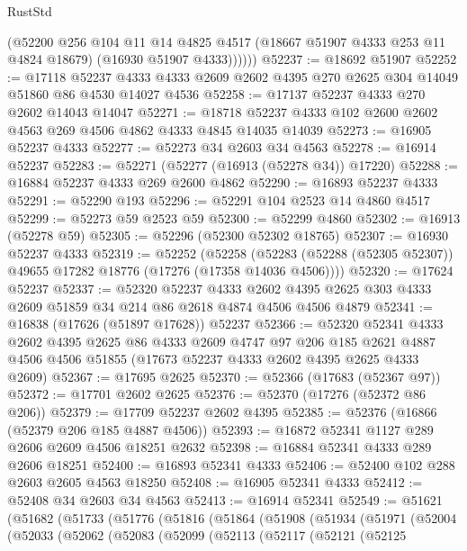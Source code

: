 \begin{lexlean}{RustStd}
\begin{coremodule}
            (@52200
              @256
              @104
              @11
              @14
              @4825
              @4517
              (@18667 @51907 @4333 @253 @11 @4824 @18679)
              (@16930 @51907 @4333))))))
@52237 := @18692 @51907
@52252 := @17118
    @52237
    @4333
    @4333
    @2609
    @2602
    @4395
    @270
    @2625
    @304
    @14049
    @51860
    @86
    @4530
    @14027
    @4536
@52258 := @17137 @52237 @4333 @270 @2602 @14043 @14047
@52271 := @18718 @52237 @4333 @102 @2600 @2602 @4563 @269 @4506 @4862 @4333 @4845 @14035 @14039
@52273 := @16905 @52237 @4333
@52277 := @52273 @34 @2603 @34 @4563
@52278 := @16914 @52237
@52283 := @52271 (@52277 (@16913 (@52278 @34)) @17220)
@52288 := @16884 @52237 @4333 @269 @2600 @4862
@52290 := @16893 @52237 @4333
@52291 := @52290 @193
@52296 := @52291 @104 @2523 @14 @4860 @4517
@52299 := @52273 @59 @2523 @59
@52300 := @52299 @4860
@52302 := @16913 (@52278 @59)
@52305 := @52296 (@52300 @52302 @18765)
@52307 := @16930 @52237 @4333
@52319 := @52252
    (@52258 (@52283 (@52288 (@52305 @52307)) @49655 @17282 @18776 (@17276 (@17358 @14036 @4506))))
@52320 := @17624 @52237
@52337 := @52320
    @52237
    @4333
    @2602
    @4395
    @2625
    @303
    @4333
    @2609
    @51859
    @34
    @214
    @86
    @2618
    @4874
    @4506
    @4506
    @4879
@52341 := @16838 (@17626 (@51897 @17628)) @52237
@52366 := @52320
    @52341
    @4333
    @2602
    @4395
    @2625
    @86
    @4333
    @2609
    @4747
    @97
    @206
    @185
    @2621
    @4887
    @4506
    @4506
    @51855
    (@17673 @52237 @4333 @2602 @4395 @2625 @4333 @2609)
@52367 := @17695 @2625
@52370 := @52366 (@17683 (@52367 @97))
@52372 := @17701 @2602 @2625
@52376 := @52370 (@17276 (@52372 @86 @206))
@52379 := @17709 @52237 @2602 @4395
@52385 := @52376 (@16866 (@52379 @206 @185 @4887 @4506))
@52393 := @16872 @52341 @1127 @289 @2606 @2609 @4506 @18251 @2632
@52398 := @16884 @52341 @4333 @289 @2606 @18251
@52400 := @16893 @52341 @4333
@52406 := @52400 @102 @288 @2603 @2605 @4563 @18250
@52408 := @16905 @52341 @4333
@52412 := @52408 @34 @2603 @34 @4563
@52413 := @16914 @52341
@52549 := @51621
    (@51682
      (@51733
        (@51776
          (@51816
            (@51864
              (@51908
                (@51934
                  (@51971
                    (@52004
                      (@52033
                        (@52062
                          (@52083
                            (@52099
                              (@52113
                                (@52117
                                  (@52121
                                    (@52125

\end{coremodule}
\end{lexlean}

